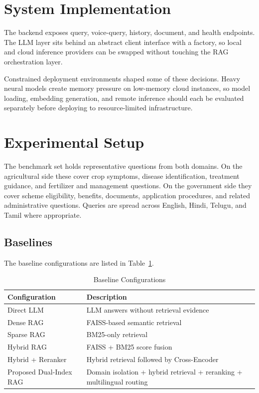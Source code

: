 \documentclass[10pt,twocolumn,letterpaper]{article}
\begin{document}
\section{System Implementation}
The backend exposes query, voice-query, history, document, and health endpoints. The LLM layer sits behind an abstract client interface with a factory, so local and cloud inference providers can be swapped without touching the RAG orchestration layer.

Constrained deployment environments shaped some of these decisions. Heavy neural models create memory pressure on low-memory cloud instances, so model loading, embedding generation, and remote inference should each be evaluated separately before deploying to resource-limited infrastructure.

\section{Experimental Setup}
The benchmark set holds representative questions from both domains. On the agricultural side these cover crop symptoms, disease identification, treatment guidance, and fertilizer and management questions. On the government side they cover scheme eligibility, benefits, documents, application procedures, and related administrative questions. Queries are spread across English, Hindi, Telugu, and Tamil where appropriate.

\subsection{Baselines}
The baseline configurations are listed in Table~\ref{tab:baselines}.

\begin{table}[t]
\caption{Baseline Configurations}
\label{tab:baselines}
\centering
\footnotesize
\begin{tabular}{@{}p{2.3cm}p{5.0cm}@{}}
\toprule
\textbf{Configuration} & \textbf{Description} \\
\midrule
Direct LLM & LLM answers without retrieval evidence \\
Dense RAG & FAISS-based semantic retrieval \\
Sparse RAG & BM25-only retrieval \\
Hybrid RAG & FAISS + BM25 score fusion \\
Hybrid + Reranker & Hybrid retrieval followed by Cross-Encoder \\
Proposed Dual-Index RAG & Domain isolation + hybrid retrieval + reranking + multilingual routing \\
\bottomrule
\end{tabular}
\end{table}
\end{document}
